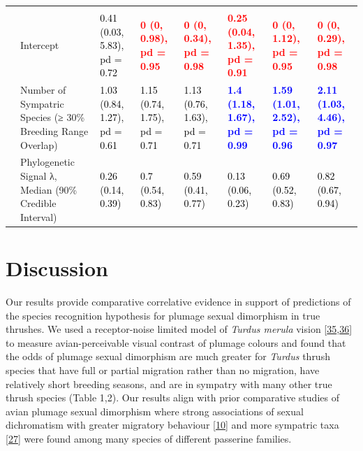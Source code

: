\documentclass[
  a4paper,
]{article}
\begin{document}
\begin{landscape}
\begin{table}
{\begin{tabular}[t]{llllllll}
\addlinespace[0.3em]
\multicolumn{1}{l}{\textbf{Breeding Sympatry}}\\
\hspace{1em} & Intercept & \textcolor{black}{0.41 (0.03, 5.83), pd = 0.72} & \textcolor{red}{\textbf{0 (0, 0.98), pd = 0.95}} & \textcolor{red}{\textbf{0 (0, 0.34), pd = 0.98}} & \textcolor{red}{\textbf{0.25 (0.04, 1.35), pd = 0.91}} & \textcolor{red}{\textbf{0 (0, 1.12), pd = 0.95}} & \textcolor{red}{\textbf{0 (0, 0.29), pd = 0.98}}\\
 & Number of Sympatric Species 
\hspace{1em} (≥ 30\% Breeding Range Overlap) & \textcolor{black}{1.03 (0.84, 1.27), pd = 0.61} & \textcolor{black}{1.15 (0.74, 1.75), pd = 0.71} & \textcolor{black}{1.13 (0.76, 1.63), pd = 0.71} & \textcolor{blue}{\textbf{1.4 (1.18, 1.67), pd = 0.99}} & \textcolor{blue}{\textbf{1.59 (1.01, 2.52), pd = 0.96}} & \textcolor{blue}{\textbf{2.11 (1.03, 4.46), pd = 0.97}}\\
\hspace{1em} & Phylogenetic Signal λ, Median (90\% Credible Interval) & \textcolor{black}{0.26 (0.14, 0.39)} & \textcolor{black}{0.7 (0.54, 0.83)} & \textcolor{black}{0.59 (0.41, 0.77)} & \textcolor{black}{0.13 (0.06, 0.23)} & \textcolor{black}{0.69 (0.52, 0.83)} & \textcolor{black}{0.82 (0.67, 0.94)}\\
\bottomrule
\end{tabular}}
\end{table}
\end{landscape}

\hypertarget{discussion}{%
\section{Discussion}\label{discussion}}

Our results provide comparative correlative evidence in support of
predictions of the species recognition hypothesis for plumage sexual
dimorphism in true thrushes. We used a receptor-noise limited model of
\emph{Turdus merula} vision
{[}\protect\hyperlink{ref-vorobyev1998}{35},\protect\hyperlink{ref-hart2000}{36}{]}
to measure avian-perceivable visual contrast of plumage colours and
found that the odds of plumage sexual dimorphism are much greater for
\emph{Turdus} thrush species that have full or partial migration rather
than no migration, have relatively short breeding seasons, and are in
sympatry with many other true thrush species (Table 1,2). Our results
align with prior comparative studies of avian plumage sexual dimorphism
where strong associations of sexual dichromatism with greater migratory
behaviour {[}\protect\hyperlink{ref-dale2015}{10}{]} and more sympatric
taxa {[}\protect\hyperlink{ref-cooney2017}{27}{]} were found among many
species of different passerine families.
\end{document}
